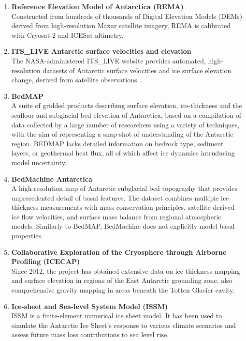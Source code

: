 \begin{enumerate}
    \item\textbf{Reference Elevation Model of Antarctica (REMA)}\\
   Constructed from hundreds of thousands of Digital Elevation Models (DEMs) derived from high-resolution Maxar satellite imagery, REMA is calibrated with Cryosat-2 and ICESat altimetry\cite{REMA}.

    \item\textbf{ITS\_LIVE Antarctic surface velocities and elevation}\\
    The NASA-administered ITS\_LIVE website provides automated, high-resolution datasets of Antarctic surface velocities and ice surface elevation change, derived from satellite observations~\cite{itslive}.

    \item\textbf{BedMAP}\\ 
    A suite of gridded products describing surface elevation, ice-thickness and the seafloor and subglacial bed elevation of Antarctica, based on a compilation of data collected by a large number of researchers using a variety of techniques, with the aim of representing a snap-shot of understanding of the Antarctic region\cite{Fretwell_2013}. BEDMAP lacks detailed information on bedrock type, sediment layers, or geothermal heat flux, all of which affect ice dynamics intruducing model uncertainty.

    \item\textbf{BedMachine Antarctica}\\
    A high-resolution map of Antarctic subglacial bed topography that provides unprecedented detail of basal features. The dataset combines multiple ice thickness measurements with mass conservation principles, satellite-derived ice flow velocities, and surface mass balance from regional atmospheric models\cite{Morlighem_2020}. Similarly to BedMAP, BedMachine does not explicitly model basal properties.

    \item\textbf{Collaborative Exploration of the Cryosphere through Airborne Profiling (ICECAP)}\\ 
    Since 2012, the project has obtained extensive data on ice thickness mapping and surface elevation in regions of the East Antarctic grounding zone, also comprehensive gravity mapping in areas beneath the Totten Glacier cavity\cite{ICECAP}.

    \item\textbf{Ice-sheet and Sea-level System Model (ISSM)}\\
    ISSM is a finite-element numerical ice sheet model. It has been used to simulate the Antarctic Ice Sheet’s response to various climate scenarios and assess future mass loss contributions to sea level rise\cite{deRydt_2013, Morlighem_2020, ISSM}.
\end{enumerate}


